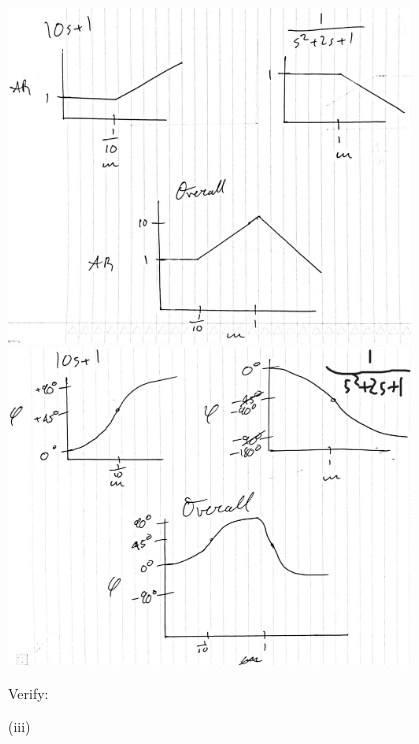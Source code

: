 \documentclass[12pt]{article}
\begin{document}
\begin{enumerate}
    \begin{center}
        \includegraphics[width=0.8\textwidth]{assets/ii_mag.jpg}
        \includegraphics[width=0.8\textwidth]{assets/ii_phase.jpg}
    \end{center}

    Verify:

    \begin{center}
        
    \end{center}

    (iii)


\end{enumerate}
\end{document}
